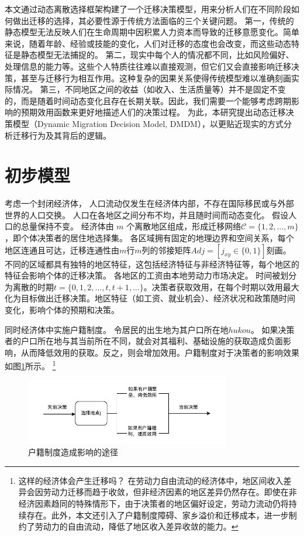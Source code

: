 \documentclass[a4paper, zihao=-4, fontset = mac, oneside]{ctexbook} %
\let\oldfootnote\footnote
\renewcommand{\footnote}[1]{%
  \oldfootnote{\setstretch{1.5}#1}%
}
\begin{document}
本文通过动态离散选择框架构建了一个迁移决策模型，用来分析人们在不同阶段如何做出迁移的选择，其必要性源于传统方法面临的三个关键问题。
第一，传统的静态模型无法反映人们在生命周期中因积累人力资本而导致的迁移意愿变化。简单来说，随着年龄、经验或技能的变化，人们对迁移的态度也会改变，而这些动态特征是静态模型无法捕捉的。  
第二，现实中每个人的情况都不同，比如风险偏好、处理信息的能力等。这些个人特质往往难以直接观测，但它们又会直接影响迁移决策，甚至与迁移行为相互作用。这种复杂的因果关系使得传统模型难以准确刻画实际情况。  
第三，不同地区之间的收益（如收入、生活质量等）并不是固定不变的，而是随着时间动态变化且存在长期关联。因此，我们需要一个能够考虑跨期影响的预期效用函数来更好地描述人们的决策过程。  
为此，本研究提出动态迁移决策模型（Dynamic Migration Decision Model, DMDM），以更贴近现实的方式分析迁移行为及其背后的逻辑。

\section{初步模型}

考虑一个封闭经济体，
人口流动仅发生在经济体内部，不存在国际移民或与外部世界的人口交换。
人口在各地区之间分布不均，并且随时间而动态变化。
假设人口的总量保持不变。
经济体由 $m$ 个离散地区组成，形成迁移网络$\mathcal{C} = \{1,2,\dots,m\}$，即个体决策者的居住地选择集。
各区域拥有固定的地理边界和空间关系，每个地区连通且可达，迁移连通性由$m$行$m$列的邻接矩阵$Adj=[j_{xy}\in\{0,1\}]$刻画。
不同的区域都具有独特的地区特征，这包括经济特征与非经济特征等，每个地区的特征会影响个体的迁移决策。
各地区的工资由本地劳动力市场决定。
时间被划分为离散的时期$t=\{0,1,2,\ldots,t,t+1,\ldots\}$。决策者获取效用，在每个时期以效用最大化为目标做出迁移决策。地区特征（如工资、就业机会）、经济状况和政策随时间变化，影响个体的预期和决策。

同时经济体中实施户籍制度。
令居民的出生地为其户口所在地$hukou$。
如果决策者的户口所在地与其当前所在不同，就会对其福利、基础设施的获取造成负面影响，从而降低效用的获取。反之，则会增加效用。户籍制度对于决策者的影响效果如图\ref{fig:户籍制度造成影响的途径}所示。
\footnote{
这样的经济体会产生迁移吗？
在劳动力自由流动的经济体中，地区间收入差异会因劳动力迁移而趋于收敛，但非经济因素的地区差异仍然存在。即使在非经济因素趋同的特殊情形下，由于决策者的地区偏好设定，劳动力流动仍将持续存在。此外，本文还引入了户籍制度障碍、家乡溢价和迁移成本，进一步制约了劳动力的自由流动，降低了地区收入差异收敛的能力。
}

\begin{figure}[!ht]
\centering
\caption{户籍制度造成影响的途径}
\label{fig:户籍制度造成影响的途径}
\includegraphics[width=0.8\textwidth]{images/户口影响.drawio.pdf}
\end{figure}
\end{document}
